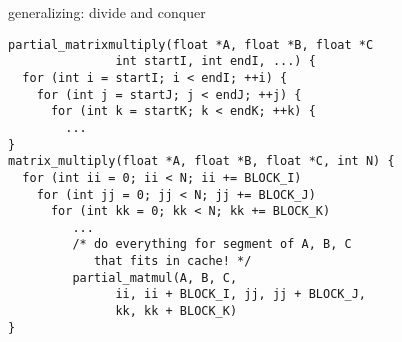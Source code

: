 \begin{frame}[fragile,label=cacheDivideConquer]{generalizing: divide and conquer}
\lstset{style=small}
\begin{lstlisting}
partial_matrixmultiply(float *A, float *B, float *C
               int startI, int endI, ...) {
  for (int i = startI; i < endI; ++i) {
    for (int j = startJ; j < endJ; ++j) {
      for (int k = startK; k < endK; ++k) {
        ...
}
matrix_multiply(float *A, float *B, float *C, int N) {
  for (int ii = 0; ii < N; ii += BLOCK_I)
    for (int jj = 0; jj < N; jj += BLOCK_J)
      for (int kk = 0; kk < N; kk += BLOCK_K)
         ...
         /* do everything for segment of A, B, C
            that fits in cache! */
         partial_matmul(A, B, C,
               ii, ii + BLOCK_I, jj, jj + BLOCK_J,
               kk, kk + BLOCK_K)
}
\end{lstlisting}
\end{frame}
